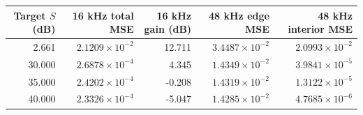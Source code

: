 \begin{tabular}{rrrrr}
\toprule
Target $S$ (dB) & 16 kHz total MSE & 16 kHz gain (dB) & 48 kHz edge MSE & 48 kHz interior MSE \\
\midrule
2.661 & $2.1209\times10^{-2}$ & 12.711 & $3.4487\times10^{-2}$ & $2.0993\times10^{-2}$ \\
30.000 & $2.6878\times10^{-4}$ & 4.345 & $1.4349\times10^{-2}$ & $3.9841\times10^{-5}$ \\
35.000 & $2.4202\times10^{-4}$ & -0.208 & $1.4319\times10^{-2}$ & $1.3122\times10^{-5}$ \\
40.000 & $2.3326\times10^{-4}$ & -5.047 & $1.4285\times10^{-2}$ & $4.7685\times10^{-6}$ \\
\bottomrule
\end{tabular}
